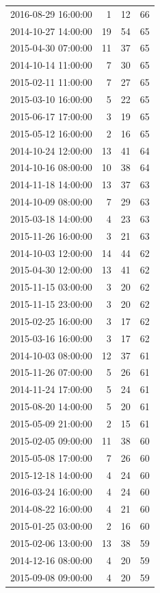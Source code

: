 \begin{tabular}{lrrr}
2016-08-29 16:00:00 & 1 & 12 & 66 \\
2014-10-27 14:00:00 & 19 & 54 & 65 \\
2015-04-30 07:00:00 & 11 & 37 & 65 \\
2014-10-14 11:00:00 & 7 & 30 & 65 \\
2015-02-11 11:00:00 & 7 & 27 & 65 \\
2015-03-10 16:00:00 & 5 & 22 & 65 \\
2015-06-17 17:00:00 & 3 & 19 & 65 \\
2015-05-12 16:00:00 & 2 & 16 & 65 \\
2014-10-24 12:00:00 & 13 & 41 & 64 \\
2014-10-16 08:00:00 & 10 & 38 & 64 \\
2014-11-18 14:00:00 & 13 & 37 & 63 \\
2014-10-09 08:00:00 & 7 & 29 & 63 \\
2015-03-18 14:00:00 & 4 & 23 & 63 \\
2015-11-26 16:00:00 & 3 & 21 & 63 \\
2014-10-03 12:00:00 & 14 & 44 & 62 \\
2015-04-30 12:00:00 & 13 & 41 & 62 \\
2015-11-15 03:00:00 & 3 & 20 & 62 \\
2015-11-15 23:00:00 & 3 & 20 & 62 \\
2015-02-25 16:00:00 & 3 & 17 & 62 \\
2015-03-16 16:00:00 & 3 & 17 & 62 \\
2014-10-03 08:00:00 & 12 & 37 & 61 \\
2015-11-26 07:00:00 & 5 & 26 & 61 \\
2014-11-24 17:00:00 & 5 & 24 & 61 \\
2015-08-20 14:00:00 & 5 & 20 & 61 \\
2015-05-09 21:00:00 & 2 & 15 & 61 \\
2015-02-05 09:00:00 & 11 & 38 & 60 \\
2015-05-08 17:00:00 & 7 & 26 & 60 \\
2015-12-18 14:00:00 & 4 & 24 & 60 \\
2016-03-24 16:00:00 & 4 & 24 & 60 \\
2014-08-22 16:00:00 & 4 & 21 & 60 \\
2015-01-25 03:00:00 & 2 & 16 & 60 \\
2015-02-06 13:00:00 & 13 & 38 & 59 \\
2014-12-16 08:00:00 & 4 & 20 & 59 \\
2015-09-08 09:00:00 & 4 & 20 & 59 \\

\end{tabular}
